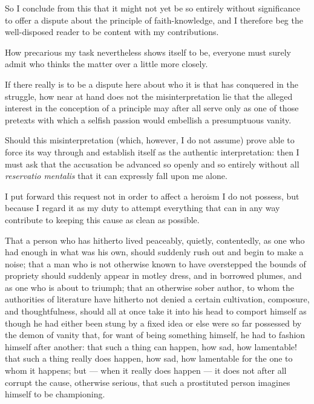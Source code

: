 \documentclass[12pt,a4paper]{book}
\begin{document}
So I conclude from this that it might not yet be so entirely without
significance to offer a dispute about the principle of faith-knowledge, and I
therefore beg the well-disposed reader to be content with my contributions.

How precarious my task nevertheless shows itself to be, everyone must surely
admit who thinks the matter over a little more closely.

If there really is to be a dispute here about who it is that has conquered in
the struggle, how near at hand does not the misinterpretation lie that the
alleged interest in the conception of a principle may after all serve only as
one of those pretexts with which a selfish passion would embellish a
presumptuous vanity.

Should this misinterpretation (which, however, I do not assume) prove able to
force its way through and establish itself as the authentic interpretation:
then I must ask that the accusation be advanced so openly and so entirely
without all \textit{reservatio mentalis} that it can expressly fall upon me
alone.

I put forward this request not in order to affect a heroism I do not possess,
but because I regard it as my duty to attempt everything that can in any way
contribute to keeping this cause as clean as possible.

That a person who has hitherto lived peaceably, quietly, contentedly, as one
who had enough in what was his own, should suddenly rush out and begin to make
a noise; that a man who is not otherwise known to have overstepped the bounds
of propriety should suddenly appear in motley dress, and in borrowed plumes,
and as one who is about to triumph; that an otherwise sober author, to whom the
authorities of literature have hitherto not denied a certain cultivation,
composure, and thoughtfulness, should all at once take it into his head to
comport himself as though he had either been stung by a fixed idea or else were
so far possessed by the demon of vanity that, for want of being something
himself, he had to fashion himself after another: that such a thing can happen,
how sad, how lamentable! that such a thing really does happen, how sad, how
lamentable for the one to whom it happens; but --- when it really does happen
--- it does not after all corrupt the cause, otherwise serious, that such a
prostituted person imagines himself to be championing.
\end{document}

